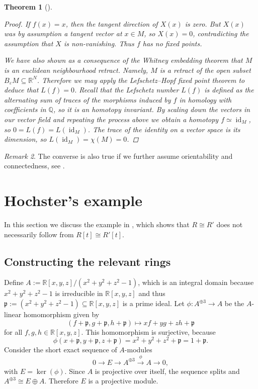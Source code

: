 \documentclass[A4paper, 12pt, british, reqno]{amsart}
\newcommand{\Q}{\mathbb{Q}} %
\newcommand{\R}{\mathbb{R}} %
\newcommand{\p}{\mathfrak{p}}
\theoremstyle{plain}
\newtheorem{thm}{Theorem}[section]
\theoremstyle{definition}
\theoremstyle{remark}
\newtheorem{rem}[thm]{Remark}
\theoremstyle{plain}
\theoremstyle{definition}
\theoremstyle{remark}
\theoremstyle{plain}
\theoremstyle{definition}
\theoremstyle{remark}
\DeclareMathOperator{\id}{id}
\newcommand{\op}{\oplus}
\begin{document}
{\begin{thm}[{\cite[Corollary IV.23.6]{bre93}}]
\begin{proof}
	If $f(x)=x$, then the tangent direction of $X(x)$ is zero.
	But $X(x)$ was by assumption a tangent vector at $x\in M$, so $X(x)=0$, contradicting the assumption that $X$ is non-vanishing.
	Thus $f$ has no fixed points.

	We have also shown as a consequence of the Whitney embedding theorem that $M$ is an euclidean neighbourhood retract.
	Namely, $M$ is a retract of the open subset $B_{\varepsilon}M\subseteq \R^{N}$.
	Therefore we may apply the Lefschetz--Hopf fixed point theorem \cite[Corollary IV.23.5]{bre93} to deduce that $L(f)=0$.
	Recall that the Lefschetz number $L(f)$ is defined as the alternating sum of traces of the morphisms induced by $f$ in homology with coefficients in $\Q$, so it is an homotopy invariant.
	By scaling down the vectors in our vector field and repeating the process above we obtain a homotopy $f\simeq \id_{M}$, so $0=L(f)=L(\id_{M})$.
	The trace of the identity on a vector space is its dimension, so $L(\id_{M})=\chi(M)=0$.
    \end{proof}
\end{thm}

\begin{rem}
    The converse is also true if we further assume orientability and connectedness, see \cite[Corollary VII.14.5]{bre93}.
\end{rem}
}

\section{Hochster's example}

In this section we discuss the example in \cite{hoc72}, which shows that $R\cong R'$ does not necessarily follow from $R[t]\cong R'[t]$.

\subsection{Constructing the relevant rings}
Define $A:=\R[x,y,z]/(x^{2}+y^{2}+z^{2}-1)$, which is an integral domain because $x^{2}+y^{2}+z^{2}-1$ is irreducible in $\R[x,y,z]$ and thus $\p:=(x^{2}+y^{2}+z^{2}-1) \subseteq \R[x,y,z]$ is a prime ideal.
Let $\phi\colon A^{\op 3}\to A$ be the $A$-linear homomorphism given by
\[ (f+\p,g+\p,h+\p)\longmapsto xf+yg+zh+\p \]
for all $f,g,h\in\R[x,y,z]$.
This homomorphism is surjective, because
\[ \phi(x+\p,y+\p,z+\p)=x^{2}+y^{2}+z^{2}+\p=1+\p. \]
Consider the short exact sequence of $A$-modules
\[ 0\to E\to A^{\op 3}\xrightarrow{\phi} A\to 0, \]
with $E=\ker(\phi)$.
Since $A$ is projective over itself, the sequence splits and $A^{\op 3}\cong E\op A$.
Therefore $E$ is a projective module.
\end{document}
